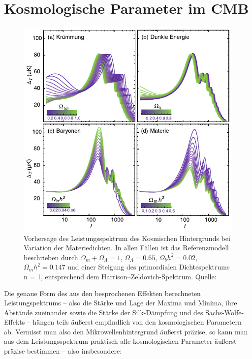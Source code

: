 \documentclass[10pt,a4paper]{article}
\begin{document}
\section{Kosmologische Parameter im CMB}
\begin{figure}[b!]
\center
\includegraphics[scale=0.8]{cmbvar}
\caption{Vorhersage des Leistungsspektrum des Kosmischen Hintergrunds bei Variation der Materiedichten. In allen Fällen ist das Referenzmodell beschrieben durch $\Omega_m + \Omega_\Lambda = 1$, $\Omega_\Lambda = 0.65$, $\Omega_b h^2 = 0.02$, $\Omega_m h^2 = 0.147$ und einer Steigung des primordialen Dichtespektrums n = 1, entsprechend dem Harrison–Zeldovich-Spektrum. Quelle: \cite{Schneider}}
\label{cmbvar}
\end{figure}
Die genaue Form des aus den besprochenen Effekten berechneten Leistungspektrums -- also die Stärke und Lage der Maxima und Minima, ihre Abstände zueinander sowie die Stärke der Silk-Dämpfung und des Sachs-Wolfe-Effekts -- hängen teils äußerst empfindlich von den kosmologischen Parametern ab. Vermisst man also den Mikrowellenhintergrund äußerst präzise, so kann man aus dem Leistungsspektrum praktisch alle kosmologischen Parameter äußerst präzise bestimmen -- also insbesondere:
\end{document}
